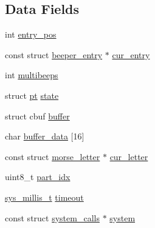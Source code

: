 \subsection*{Data Fields}
\begin{DoxyCompactItemize}
\item 
int \hyperlink{structbeeper_af508264fa7f97731d34f27de9f36ee2b}{entry\+\_\+pos}
\item 
const struct \hyperlink{structbeeper__entry}{beeper\+\_\+entry} $\ast$ \hyperlink{structbeeper_a4619344c394ff4d8a1f09a37bf7e3c48}{cur\+\_\+entry}
\item 
int \hyperlink{structbeeper_aee193ec6a8fa80c1bd048809db61c9a4}{multibeeps}
\item 
struct \hyperlink{structpt}{pt} \hyperlink{structbeeper_a5a97f78ac16889d154b5f430d709ecab}{state}
\item 
struct cbuf \hyperlink{structbeeper_ae9e6bbf81c3c24e59c1316297c14b595}{buffer}
\item 
char \hyperlink{structbeeper_a2e32a07faeb367ecd7763a5375d888e9}{buffer\+\_\+data} \mbox{[}16\mbox{]}
\item 
const struct \hyperlink{structmorse__letter}{morse\+\_\+letter} $\ast$ \hyperlink{structbeeper_ac15806fd0e71f244e12c425fb87b10b5}{cur\+\_\+letter}
\item 
uint8\+\_\+t \hyperlink{structbeeper_ad2919512c904f405c7c9f674bb5e5375}{part\+\_\+idx}
\item 
\hyperlink{system__calls_8h_a62a9a2e72861132c17d4d4b29bb8b80a}{sys\+\_\+millis\+\_\+t} \hyperlink{structbeeper_a28da8e21fa04907edfc4fae193067d54}{timeout}
\item 
const struct \hyperlink{structsystem__calls}{system\+\_\+calls} $\ast$ \hyperlink{structbeeper_aa6ed73a897dd2e40c5a385795e5ff9f6}{system}
\end{DoxyCompactItemize}


